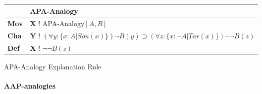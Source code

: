 					\begin{Scheme}[H]\footnotesize
               		\centering
               		\begin{tabular}{l l}
               			                   & \textbf{APA-Analogy}                                                                                                                                                                                                                                                                               \\ \toprule
               			\textbf{Mov}      & \textbf{X} ! APA-Analogy$[A,B]$                                                                                                                                                                                                                                                                                     \\ \midrule
               			\textbf{Cha} & \textbf{Y} ! $(\forall y: \{ x: A| Sou(x)\} ) \neg B(y) \supset (\forall z : \{ x: \neg A| Tar(x)\} ) \neg \neg B(z)$                                                                                                                                                                                                                                                                                           \\ \midrule
               			\textbf{Def}   & \textbf{X} ! $\neg \neg B(z)$ \\ \bottomrule
               		\end{tabular}
               		\caption{APA-Analogy Explanation Rule}
               		\label{APAAnalogyExplanation}
					\end{Scheme}
			
			\newpage		
			\paragraph{AAP-analogies}
			
